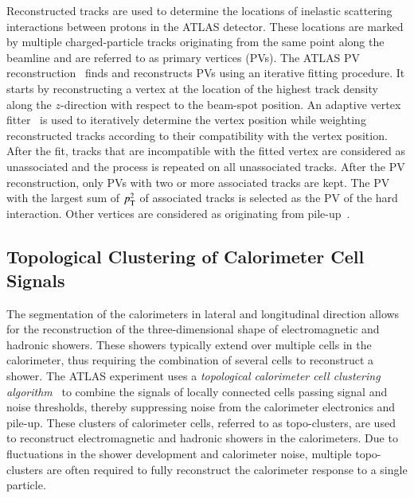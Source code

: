Reconstructed tracks are used to determine the locations of inelastic scattering
interactions between protons in the ATLAS detector. These locations are marked
by multiple charged-particle tracks originating from the same point along the
beamline and are referred to as primary vertices (PVs).
The ATLAS PV reconstruction~\cite{PERF-2015-01} finds and reconstructs PVs using
an iterative fitting procedure. It starts by reconstructing a vertex at the
location of the highest track density along the $z$-direction with respect to the
beam-spot position. An adaptive vertex fitter~\cite{Fruhwirth:2007hz} is used to
iteratively determine the vertex position while weighting reconstructed tracks
according to their compatibility with the vertex position. After the fit, tracks
that are incompatible with the fitted vertex are considered as unassociated and
the process is repeated on all unassociated tracks. After the PV reconstruction,
only PVs with two or more associated tracks are kept. The PV with the largest sum of
$p_{\text{T}}^2$ of associated tracks is selected as the PV of the hard
interaction. Other vertices are considered as originating from
pile-up~\cite{PERF-2015-01}.


\subsection{Topological Clustering of Calorimeter Cell Signals}

The segmentation of the calorimeters in lateral and longitudinal direction
allows for the reconstruction of the three-dimensional shape of electromagnetic
and hadronic showers. These showers typically extend over multiple cells in the
calorimeter, thus requiring the combination of several cells to reconstruct a
shower. The ATLAS experiment uses a \emph{topological calorimeter cell
  clustering algorithm}~\cite{PERF-2014-07} to combine the signals of locally
connected cells passing signal and noise thresholds, thereby suppressing noise
from the calorimeter electronics and pile-up. These clusters of calorimeter
cells, referred to as topo-clusters, are used to reconstruct electromagnetic and
hadronic showers in the calorimeters. Due to fluctuations in the shower
development and calorimeter noise, multiple topo-clusters are often required to
fully reconstruct the calorimeter response to a single particle.

